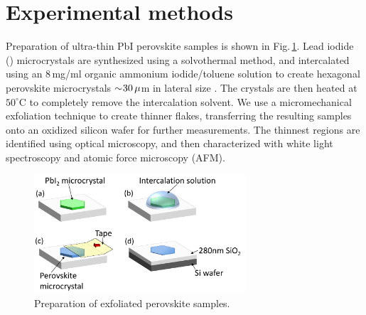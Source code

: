 \section{Experimental methods}
Preparation of ultra-thin PbI perovskite samples is shown in Fig.\,\ref{5Fig1}. Lead iodide () microcrystals are synthesized using a solvothermal method, and intercalated using an 8\,mg/ml organic ammonium iodide/toluene solution to create hexagonal perovskite microcrystals $\sim\negmedspace30\,\mu$m in lateral size \cite{Saikumar2012}. The crystals are then heated at $50^{\circ}$C to completely remove the intercalation solvent. We use a micromechanical exfoliation technique to create thinner flakes, transferring the resulting samples onto an oxidized silicon wafer for further measurements. The thinnest regions are identified using optical microscopy, and then characterized with white light spectroscopy and atomic force microscopy (AFM).
\begin{figure}[h!] 
\centering    
\includegraphics[width=0.7\textwidth]{Fig1}
\caption{Preparation of exfoliated perovskite samples.}
\label{5Fig1}
\end{figure}

